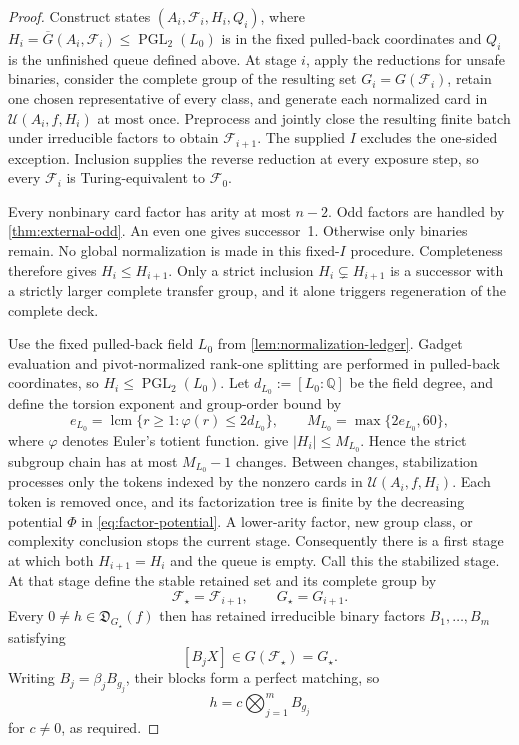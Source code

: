 \documentclass[11pt,letterpaper,onecolumn]{article}
\theoremstyle{plain}
\theoremstyle{definition}
\theoremstyle{remark}
\newcommand{\cF}{\mathcal F}
\newcommand{\PGL}{\operatorname{PGL}}
\begin{document}
\begin{proof}
Construct states \((A_i,\cF_i,H_i,Q_i)\), where
\(H_i=\overline G(A_i,\cF_i)\le\PGL_2(L_0)\) is in the fixed
pulled-back coordinates and \(Q_i\) is the unfinished queue defined above.
At stage \(i\), apply the reductions for unsafe binaries,
consider the complete group of the resulting set \(G_i=G(\cF_i)\), retain one chosen representative of every class, and generate each normalized card in
\(\mathscr U(A_i,f,H_i)\) at most once.  Preprocess and jointly
close the resulting finite batch under irreducible factors to obtain \(\cF_{i+1}\).
The supplied \(I\) excludes the one-sided exception.  Inclusion supplies the
reverse reduction at every exposure step, so every \(\cF_i\) is
Turing-equivalent to \(\cF_0\).

Every nonbinary card factor has arity at most \(n-2\).  Odd factors are
handled by \cref{thm:external-odd}. An even one gives successor~1.
Otherwise only binaries remain.
  No global normalization is made in this fixed-\(I\) procedure.  Completeness
  therefore gives \(H_i\le H_{i+1}\). Only a strict inclusion
  \(H_i\subsetneq H_{i+1}\) is a successor with a strictly larger complete transfer group, and it alone triggers
  regeneration of the complete deck.

Use the fixed pulled-back field \(L_0\) from
\cref{lem:normalization-ledger}.  Gadget evaluation and pivot-normalized
rank-one splitting are performed in pulled-back coordinates, so
\(H_i\le\PGL_2(L_0)\).  Let \(d_{L_0}:=[L_0:\mathbb Q]\) be the field
degree, and define the torsion exponent and group-order bound by
\begin{equation}
  e_{L_0}=\operatorname{lcm}\{r\ge1:\varphi(r)\le2d_{L_0}\},
  \qquad
  M_{L_0}=\max\{2e_{L_0},60\},
  \label{eq:deck-group-bound}
\end{equation}
where \(\varphi\) denotes Euler's totient function.
 give
\(|H_i|\le M_{L_0}\).  Hence the strict subgroup chain has at most
\(M_{L_0}-1\) changes. Between changes, stabilization processes only the
tokens indexed by the nonzero cards in \(\mathscr U(A_i,f,H_i)\). Each
token is removed once, and its factorization tree is finite by the decreasing
potential \(\Phi\) in \cref{eq:factor-potential}. A lower-arity factor,
new group class, or complexity conclusion stops the current stage.
Consequently there is a first stage at which both \(H_{i+1}=H_i\) and
the queue is empty. Call this the stabilized stage.
At that stage define the stable retained set and its complete group by
\[
  \cF_\star=\cF_{i+1},
  \qquad G_\star=G_{i+1}.
\]
Every \(0\ne h\in\mathfrak D_{G_\star}(f)\) then has retained irreducible binary
factors \(B_1,\ldots,B_m\) satisfying
\[
  [B_jX]\in G(\cF_\star)=G_\star.
\]
Writing \(B_j=\beta_jB_{g_j}\), their blocks form a perfect matching, so
\[
  h=c\bigotimes_{j=1}^m B_{g_j}
\]
for \(c\ne0\), as required.
\end{proof}
\end{document}
